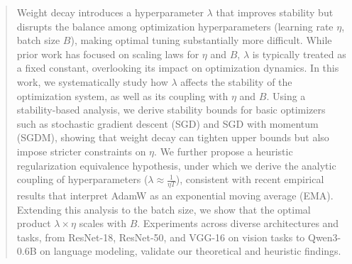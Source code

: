 \begin{abstract}
Weight decay introduces a hyperparameter $\lambda$ that improves stability but disrupts the balance among optimization hyperparameters (learning rate $\eta$, batch size $B$), making optimal tuning substantially more difficult. While prior work has focused on scaling laws for $\eta$ and $B$, $\lambda$ is typically treated as a fixed constant, overlooking its impact on optimization dynamics. In this work, we systematically study how $\lambda$ affects the stability of the optimization system, as well as its coupling with $\eta$ and $B$. Using a stability-based analysis, we derive stability bounds for basic optimizers such as stochastic gradient descent (SGD) and SGD with momentum (SGDM), showing that weight decay can tighten upper bounds but also impose stricter constraints on $\eta$. We further propose a heuristic regularization equivalence hypothesis, under which we derive the analytic coupling of hyperparameters ($\lambda \approx \frac{1}{\eta T}$), consistent with recent empirical results that interpret AdamW as an exponential moving average (EMA). Extending this analysis to the batch size, we show that the optimal product $\lambda\times \eta$ scales with $B$. Experiments across diverse architectures and tasks, from ResNet-18, ResNet-50, and VGG-16 on vision tasks to Qwen3-0.6B on language modeling, validate our theoretical and heuristic findings.

\end{abstract}